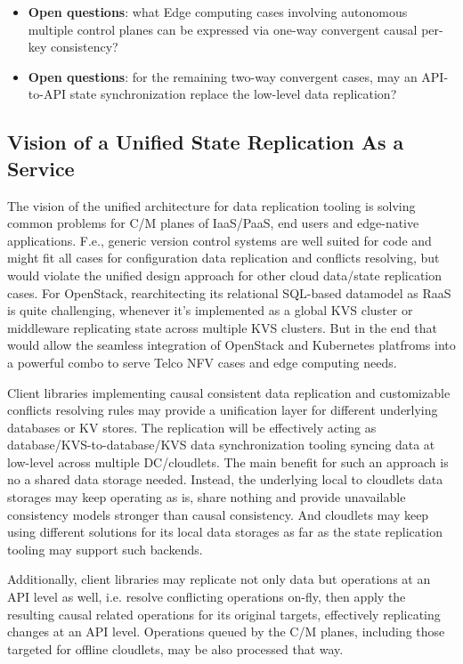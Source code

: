 \documentclass[conference]{IEEEtran}
\begin{document}
\begin{itemize}
  \item \textbf{Open questions}: what Edge computing cases involving autonomous
    multiple control planes can be expressed via one-way convergent causal
    per-key consistency?
\item \textbf{Open questions}: for the remaining two-way convergent cases,
    may an API-to-API state synchronization replace the low-level data
    replication?
\end{itemize}

\subsection{Vision of a Unified State Replication As a Service}
The vision of the unified architecture for data replication tooling is solving
common problems for C/M planes of IaaS/PaaS, end users and edge-native
applications. F.e., generic version control systems are well suited for code
and might fit all cases for configuration data replication and conflicts
resolving, but would violate the unified design approach for other cloud
data/state replication cases. For OpenStack, rearchitecting its relational
SQL-based datamodel as RaaS is quite challenging, whenever it's implemented as
a global KVS cluster or middleware replicating state across multiple KVS
clusters. But in the end that would allow the seamless integration of OpenStack
and Kubernetes platfroms into a powerful combo to serve Telco NFV cases and
edge computing needs.

Client libraries implementing causal consistent data replication and
customizable conflicts resolving rules may provide a unification layer for
different underlying databases or KV stores. The replication will be
effectively acting as database/KVS-to-database/KVS data synchronization tooling
syncing data at low-level across multiple DC/cloudlets. The main benefit for
such an approach is no a shared data storage needed. Instead, the underlying
local to cloudlets data storages may keep operating as is, share nothing and
provide unavailable consistency models stronger than causal consistency. And
cloudlets may keep using different solutions for its local data storages as far
as the state replication tooling may support such backends.

Additionally, client libraries may replicate not only data but operations at an
API level as well, i.e. resolve conflicting operations on-fly, then apply the
resulting causal related operations for its original targets, effectively
replicating changes at an API level. Operations queued by the C/M planes,
including those targeted for offline cloudlets, may be also processed that way.
\end{document}

